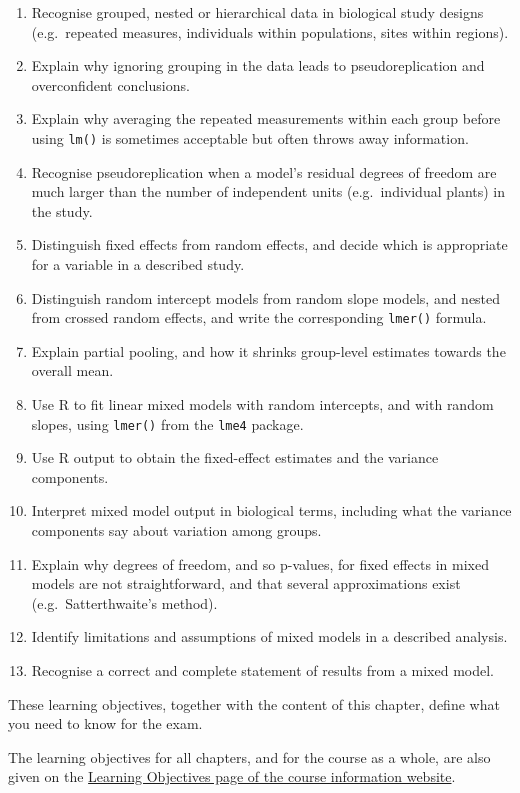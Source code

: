 \documentclass[
  letterpaper,
  8pt,
  a4paper]{book}
\providecommand{\tightlist}{%
  \setlength{\itemsep}{0pt}\setlength{\parskip}{0pt}}
\begin{document}
\begin{tcolorbox}
\begin{enumerate}
\def\labelenumi{\arabic{enumi}.}
\tightlist
\item
  Recognise grouped, nested or hierarchical data in biological study
  designs (e.g.~repeated measures, individuals within populations, sites
  within regions).
\item
  Explain why ignoring grouping in the data leads to pseudoreplication
  and overconfident conclusions.
\item
  Explain why averaging the repeated measurements within each group
  before using \texttt{lm()} is sometimes acceptable but often throws
  away information.
\item
  Recognise pseudoreplication when a model's residual degrees of freedom
  are much larger than the number of independent units (e.g.~individual
  plants) in the study.
\item
  Distinguish fixed effects from random effects, and decide which is
  appropriate for a variable in a described study.
\item
  Distinguish random intercept models from random slope models, and
  nested from crossed random effects, and write the corresponding
  \texttt{lmer()} formula.
\item
  Explain partial pooling, and how it shrinks group-level estimates
  towards the overall mean.
\item
  Use R to fit linear mixed models with random intercepts, and with
  random slopes, using \texttt{lmer()} from the \texttt{lme4} package.
\item
  Use R output to obtain the fixed-effect estimates and the variance
  components.
\item
  Interpret mixed model output in biological terms, including what the
  variance components say about variation among groups.
\item
  Explain why degrees of freedom, and so p-values, for fixed effects in
  mixed models are not straightforward, and that several approximations
  exist (e.g.~Satterthwaite's method).
\item
  Identify limitations and assumptions of mixed models in a described
  analysis.
\item
  Recognise a correct and complete statement of results from a mixed
  model.
\end{enumerate}

These learning objectives, together with the content of this chapter,
define what you need to know for the exam.

The learning objectives for all chapters, and for the course as a whole,
are also given on the
\href{https://opetchey.github.io/BIO144_Course_Information/3.1-learning-objectives.html}{Learning
Objectives page of the course information website}.

\end{tcolorbox}
\end{document}
